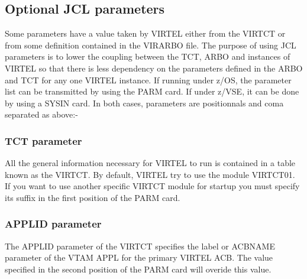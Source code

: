 \documentclass[letterpaper,10pt,english]{sphinxmanual}
\begin{document}
\ignorespaces 

\subsection{Optional JCL parameters}
\label{\detokenize{Installation_Guide:optional-jcl-parameters}}\label{\detokenize{Installation_Guide:index-10}}
Some parameters have a value taken by VIRTEL either from the VIRTCT or from some definition contained in the
VIRARBO file. The purpose of using JCL parameters is to lower the coupling between the TCT, ARBO and instances of
VIRTEL so that there is less dependency on the parameters defined in the ARBO and TCT for any one VIRTEL instance.
If running under z/OS, the parameter list can be transmitted by using the PARM card. If under z/VSE, it can be done by
using a SYSIN card. In both cases, parameters are positionnals and coma separated as above:-

\begin{sphinxVerbatim}[commandchars=\\\{\}]
\end{sphinxVerbatim}

\ignorespaces 

\subsubsection{TCT parameter}
\label{\detokenize{Installation_Guide:tct-parameter}}\label{\detokenize{Installation_Guide:index-11}}
All the general information necessary for VIRTEL to run is contained in a table known as the VIRTCT. By default, VIRTEL
try to use the module VIRTCT01. If you want to use another specific VIRTCT module for startup you must specify its
suffix in the first position of the PARM card.

\ignorespaces 

\subsubsection{APPLID parameter}
\label{\detokenize{Installation_Guide:applid-parameter}}\label{\detokenize{Installation_Guide:index-12}}
The APPLID parameter of the VIRTCT specifies the label or ACBNAME parameter of the VTAM APPL for the primary
VIRTEL ACB. The value specified in the second position of the PARM card will overide this value.
\end{document}
